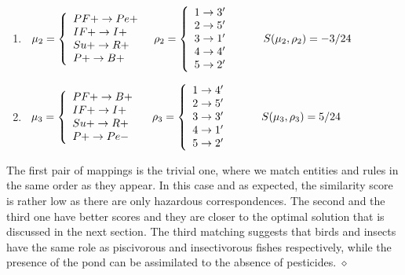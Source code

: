 \documentclass[a4paper,twoside]{article}
\begin{document}
\begin{example}[Similarity]
\begin{enumerate}
%
\item $\begin{array}{l@{\hspace{3mm}}l@{\hspace{3mm}}l}
	\mapcomp_2=\left\{
				\begin{array}{l}
					PF+ \to Pe+ \\
                    IF+ \to I+ \\
                    Su+ \to R+\\
                    P+ \to B+
				\end{array}\right.
                    &
     \maprule_2=\left\{
                \begin{array}{l}
					1 \to 3' \\
                    2 \to 5' \\
					3 \to 1' \\
                    4 \to 4' \\
					5 \to 2' \\
					\end{array}\right. 
                   &
   \qquad  \gf(\mapcomp_2,\maprule_2)=-3/24
     \end{array}$
\item $\begin{array}{l@{\hspace{3mm}}l@{\hspace{3mm}}l}
	\mapcomp_3=\left\{
				\begin{array}{l}
					PF+ \to B+ \\
                    IF+ \to I+ \\
                    Su+ \to R+\\
                    P+ \to Pe-
				\end{array}\right.
                    &
     ~\maprule_3=\left\{
                \begin{array}{l}
					1 \to 4' \\
                    2 \to 5' \\
					3 \to 3' \\
                    4 \to 1' \\
					5 \to 2' \\
					\end{array}\right.
                    &
     \qquad \gf(\mapcomp_3,\maprule_3)=5/24
     \end{array}$
%

\end{enumerate}
%
The first pair of mappings is the trivial one, where we match entities and rules in the same order as they appear. In this case and as expected, the similarity score is rather low as there are only hazardous correspondences. 
%
The second and the third one have better scores and they are closer to the optimal solution that is discussed in the next section.  
%
The third matching  suggests that birds and insects have the same role as piscivorous and insectivorous fishes respectively, while the presence of the pond can be assimilated to the absence of pesticides.  
\hfill $\diamond$
\end{example}
\end{document}
